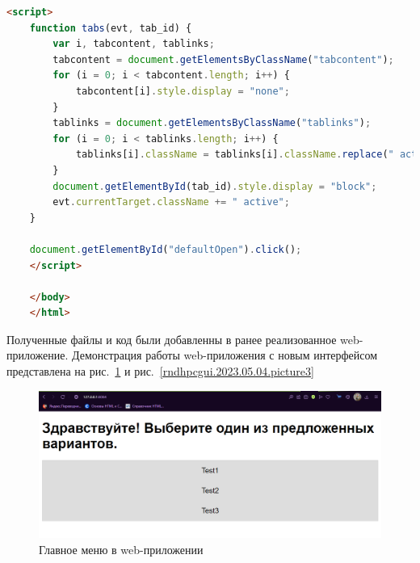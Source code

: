 \begin{lstlisting}[frame=single, label={rndhpcgui.2023.05.04.input1_html}, caption={Главное меню}, language={HTML}]
    <script>
    function tabs(evt, tab_id) {
        var i, tabcontent, tablinks;
        tabcontent = document.getElementsByClassName("tabcontent");
        for (i = 0; i < tabcontent.length; i++) {
            tabcontent[i].style.display = "none";
        }
        tablinks = document.getElementsByClassName("tablinks");
        for (i = 0; i < tablinks.length; i++) {
            tablinks[i].className = tablinks[i].className.replace(" active", "");
        }
        document.getElementById(tab_id).style.display = "block";
        evt.currentTarget.className += " active";
    }
    
    document.getElementById("defaultOpen").click();
    </script>
    
    </body>
    </html>
\end{lstlisting}

Полученные файлы и код были добавленны в ранее реализованное \textsf{web}-приложение. Демонстрация работы \textsf{web}-приложения с новым интерфейсом представлена на рис.~\ref{rndhpcgui.2023.05.04.picture2} и рис.~\ref{rndhpcgui.2023.05.04.picture3}

\begin{figure}[!ht]
    \centering
    \includegraphics[scale=0.5]{ResearchNotes/rndhpc_dev_gui_2023_05_04/rndhpcgui.2023.05.04.picture2.png}
    \caption{Главное меню в web-приложении}
    \label{rndhpcgui.2023.05.04.picture2}
\end{figure}

